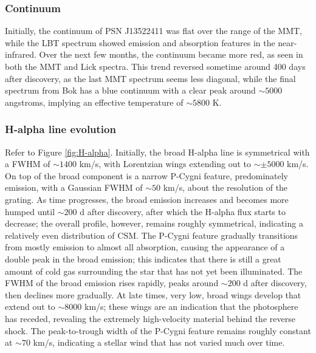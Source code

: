\documentclass[a4paper,fleqn,usenatbib]{mnras}
\begin{document}
\subsubsection{Continuum} \label{analysis:spec:cont}
Initially, the continuum of PSN J13522411 was flat over the range of the MMT, while the LBT spectrum showed emission and absorption features in the near-infrared. Over the next few months, the continuum became more red, as seen in both the MMT and Lick spectra. This trend reversed sometime around 400 days after discovery, as the last MMT spectrum seems less diagonal, while the final spectrum from Bok has a blue continuum with a clear peak around $\sim5000$ angstroms, implying an effective temperature of $\sim5800$ K.

\subsubsection{H-alpha line evolution}\label{analysis:spec:line}
Refer to Figure \ref{fig:H-alpha}. Initially, the broad H-alpha line is symmetrical with a FWHM of $\sim1400$ km/s, with Lorentzian wings extending out to $\sim\pm5000$ km/s. On top of the broad component is a narrow P-Cygni feature, predominately emission, with a Gaussian FWHM of $\sim50$ km/s, about the resolution of the grating. As time progresses, the broad emission increases and becomes more humped until $\sim200$ d after discovery, after which the H-alpha flux starts to decrease; the overall profile, however, remains roughly symmetrical, indicating a relatively even distribution of CSM. The P-Cygni feature gradually transitions from mostly emission to almost all absorption, causing the appearance of a double peak in the broad emission; this indicates that there is still a great amount of cold gas surrounding the star that has not yet been illuminated. The FWHM of the broad emission rises rapidly, peaks around $\sim200$ d after discovery, then declines more gradually. At late times, very low, broad wings develop that extend out to $\sim 8000$ km/s; these wings are an indication that the photosphere has receded, revealing the extremely high-velocity material behind the reverse shock. The peak-to-trough width of the P-Cygni feature remains roughly constant at $\sim70$ km/s, indicating a stellar wind that has not varied much over time.
\end{document}
